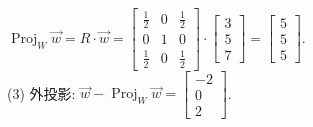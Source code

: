 \begin{solution}
    $\operatorname{Proj}_{W} \overrightarrow{w} = R \cdot \overrightarrow{w} = \begin{bmatrix}
        \frac{1}{2} & 0 & \frac{1}{2} \\
        0 & 1 & 0 \\
        \frac{1}{2} & 0 & \frac{1}{2}
    \end{bmatrix} \cdot \begin{bmatrix}
        3\\5\\7
    \end{bmatrix}= \begin{bmatrix}
        5\\5\\5
    \end{bmatrix}.$\\
    (3) 外投影: $\overrightarrow{w}-\operatorname{Proj}_{W} \overrightarrow{w}=\begin{bmatrix}
        -2\\0\\2
    \end{bmatrix}$.
\end{solution}